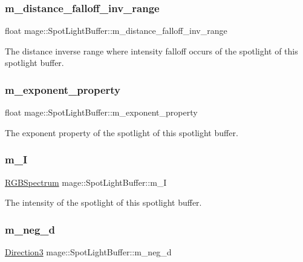 \subsubsection{\texorpdfstring{m\+\_\+distance\+\_\+falloff\+\_\+inv\+\_\+range}{m\_distance\_falloff\_inv\_range}}
{\footnotesize\ttfamily float mage\+::\+Spot\+Light\+Buffer\+::m\+\_\+distance\+\_\+falloff\+\_\+inv\+\_\+range}

The distance inverse range where intensity falloff occurs of the spotlight of this spotlight buffer. \hypertarget{structmage_1_1_spot_light_buffer_a272cd27ceece27883b9607b8fff2160c}{}\label{structmage_1_1_spot_light_buffer_a272cd27ceece27883b9607b8fff2160c} 
\subsubsection{\texorpdfstring{m\+\_\+exponent\+\_\+property}{m\_exponent\_property}}
{\footnotesize\ttfamily float mage\+::\+Spot\+Light\+Buffer\+::m\+\_\+exponent\+\_\+property}

The exponent property of the spotlight of this spotlight buffer. \hypertarget{structmage_1_1_spot_light_buffer_a778a729e75ff4074fc5aede42f551ab2}{}\label{structmage_1_1_spot_light_buffer_a778a729e75ff4074fc5aede42f551ab2} 
\subsubsection{\texorpdfstring{m\+\_\+I}{m\_I}}
{\footnotesize\ttfamily \hyperlink{structmage_1_1_r_g_b_spectrum}{R\+G\+B\+Spectrum} mage\+::\+Spot\+Light\+Buffer\+::m\+\_\+I}

The intensity of the spotlight of this spotlight buffer. \hypertarget{structmage_1_1_spot_light_buffer_ae0baddd8256464e3cdf91a766f9bf143}{}\label{structmage_1_1_spot_light_buffer_ae0baddd8256464e3cdf91a766f9bf143} 
\subsubsection{\texorpdfstring{m\+\_\+neg\+\_\+d}{m\_neg\_d}}
{\footnotesize\ttfamily \hyperlink{structmage_1_1_direction3}{Direction3} mage\+::\+Spot\+Light\+Buffer\+::m\+\_\+neg\+\_\+d}

